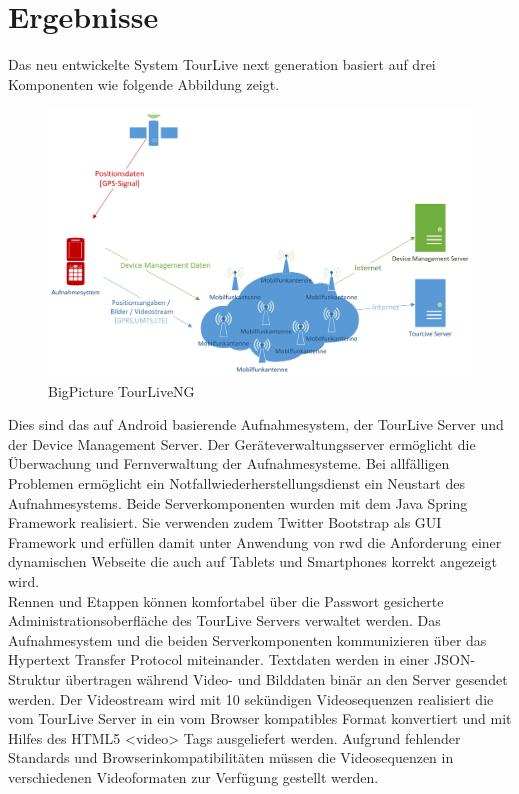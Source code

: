 \section*{Ergebnisse}
Das neu entwickelte System TourLive next generation basiert auf drei Komponenten wie folgende Abbildung zeigt. 
\begin{figure}[H]
	\centering
	\includegraphics[width=140mm]{images/android/BigPicture_AndroidClient.png} 
	\caption{BigPicture TourLiveNG}
\end{figure}
Dies sind das auf Android basierende Aufnahmesystem, der TourLive Server und der Device Management Server. Der Geräteverwaltungsserver ermöglicht die Überwachung und Fernverwaltung der Aufnahmesysteme. Bei allfälligen Problemen ermöglicht ein Notfallwiederherstellungsdienst ein Neustart des Aufnahmesystems. Beide Serverkomponenten wurden mit dem Java Spring Framework realisiert. Sie verwenden zudem Twitter Bootstrap als GUI Framework und erfüllen damit unter Anwendung von \gls{rwd} die Anforderung einer dynamischen Webseite die auch auf Tablets und Smartphones korrekt angezeigt wird. 
\\

Rennen und Etappen können komfortabel über die Passwort gesicherte Administrationsoberfläche des TourLive Servers  verwaltet werden. Das Aufnahmesystem und die beiden Serverkomponenten kommunizieren über das Hypertext Transfer Protocol miteinander. Textdaten werden in einer JSON-Struktur übertragen während Video- und Bilddaten binär an den Server gesendet  werden. Der Videostream wird mit 10 sekündigen Videosequenzen realisiert die vom TourLive Server in ein vom Browser kompatibles Format konvertiert und mit Hilfes des HTML5 <video> Tags ausgeliefert werden. Aufgrund fehlender Standards und Browserinkompatibilitäten müssen die Videosequenzen in verschiedenen Videoformaten zur Verfügung gestellt werden.


